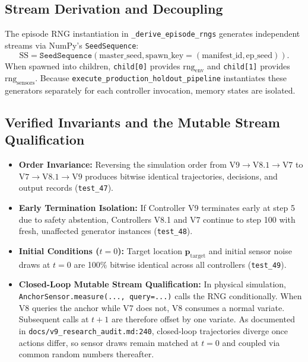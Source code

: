 \documentclass[10pt,a4paper]{article}
\begin{document}
\subsection{Stream Derivation and Decoupling}
The episode RNG instantiation in \texttt{\_derive\_episode\_rngs} generates independent streams via NumPy's \texttt{SeedSequence}:
\begin{equation}
    \mathrm{SS} = \texttt{SeedSequence}(\mathrm{master\_seed}, \mathrm{spawn\_key}=(\mathrm{manifest\_id}, \mathrm{ep\_seed})).
\end{equation}
When spawned into children, \texttt{child[0]} provides $\mathrm{rng}_{\mathrm{env}}$ and \texttt{child[1]} provides $\mathrm{rng}_{\mathrm{sensors}}$.
Because \texttt{execute\_production\_holdout\_pipeline} instantiates these generators separately for each controller invocation, memory states are isolated. 

\subsection{Verified Invariants and the Mutable Stream Qualification}
\begin{itemize}
    \item \textbf{Order Invariance:} Reversing the simulation order from $\text{V9} \to \text{V8.1} \to \text{V7}$ to $\text{V7} \to \text{V8.1} \to \text{V9}$ produces bitwise identical trajectories, decisions, and output records (\texttt{test\_47}).
    \item \textbf{Early Termination Isolation:} If Controller V9 terminates early at step 5 due to safety abstention, Controllers V8.1 and V7 continue to step 100 with fresh, unaffected generator instances (\texttt{test\_48}).
    \item \textbf{Initial Conditions ($t=0$):} Target location $\mathbf{p}_{\mathrm{target}}$ and initial sensor noise draws at $t=0$ are 100\% bitwise identical across all controllers (\texttt{test\_49}).
    \item \textbf{Closed-Loop Mutable Stream Qualification:} In physical simulation, \texttt{AnchorSensor.measure(..., query=...)} calls the RNG conditionally. When V8 queries the anchor while V7 does not, V8 consumes a normal variate. Subsequent calls at $t+1$ are therefore offset by one variate. As documented in \texttt{docs/v9\_research\_audit.md:240}, closed-loop trajectories diverge once actions differ, so sensor draws remain matched at $t=0$ and coupled via common random numbers thereafter.
\end{itemize}
\end{document}
